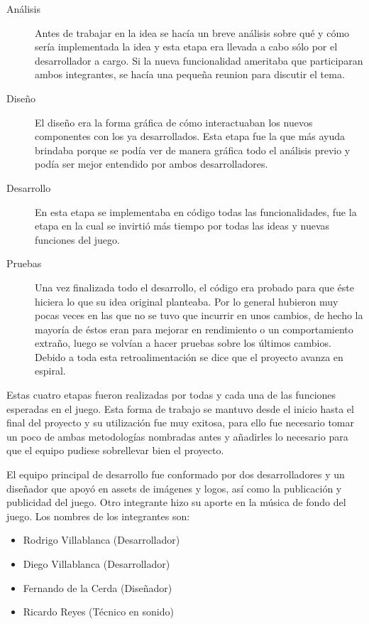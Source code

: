 \documentclass[a4paper,12pt,openany,oneside]{book}
\begin{document}
\begin{description}
\item[Análisis] Antes de trabajar en la idea se hacía un breve análisis sobre qué y cómo sería implementada la idea y esta etapa era llevada a cabo sólo por el desarrollador a cargo. Si la nueva funcionalidad ameritaba que participaran ambos integrantes, se hacía una pequeña reunion para discutir el tema.
\item[Diseño] El diseño era la forma gráfica de cómo interactuaban los nuevos componentes con los ya desarrollados. Esta etapa fue la que más ayuda brindaba porque se podía ver de manera gráfica todo el análisis previo y podía ser mejor entendido por ambos desarrolladores.
\item[Desarrollo] En esta etapa se implementaba en código todas las funcionalidades, fue la etapa en la cual se invirtió más tiempo por todas las ideas y nuevas funciones del juego.
\item[Pruebas] Una vez finalizada todo el desarrollo, el código era probado para que éste hiciera lo que su idea original planteaba. Por lo general hubieron muy pocas veces en las que no se tuvo que incurrir en unos cambios, de hecho la mayoría de éstos eran para mejorar en rendimiento o un comportamiento extraño, luego se volvían a hacer pruebas sobre los últimos cambios. Debido a toda esta retroalimentación se dice que el proyecto avanza en espiral.
\end{description}
Estas cuatro etapas fueron realizadas por todas y cada una de las funciones esperadas en el juego. Esta forma de trabajo se mantuvo desde el inicio hasta el final del proyecto y su utilización fue muy exitosa, para ello fue necesario tomar un poco de ambas metodologías nombradas antes y añadirles lo necesario para que el equipo pudiese sobrellevar bien el proyecto.

El equipo principal de desarrollo fue conformado por dos desarrolladores y un diseñador que apoyó en assets de imágenes y logos, así como la publicación y publicidad del juego. Otro integrante hizo su aporte en la música de fondo del juego.
Los nombres de los integrantes son:
\begin{itemize}
\item Rodrigo Villablanca (Desarrollador)
\item Diego Villablanca (Desarrollador)
\item Fernando de la Cerda (Diseñador)
\item Ricardo Reyes (Técnico en sonido)
\end{itemize}
\end{document}
